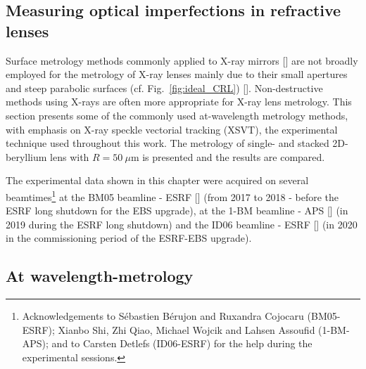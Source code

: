 \begin{refsection}
\chapter{Measuring optical imperfections in refractive lenses}\label{sec:measuring}

Surface metrology methods commonly applied to X-ray mirrors [\cite{Alcock2016, Vivo2019}] are not broadly employed for the metrology of X-ray lenses mainly due to their small apertures and steep parabolic surfaces (cf. Fig.~\ref{fig:ideal_CRL}) [\cite{Lyatun2015}]. Non-destructive methods using X-rays are often more appropriate for X-ray lens metrology. This section presents some of the commonly used at-wavelength metrology methods, with emphasis on X-ray speckle vectorial tracking (XSVT), the experimental technique used throughout this work. The metrology of single- and stacked 2D-beryllium lens with $R=50~\mu$m is presented and the results are compared. 

The experimental data shown in this chapter were acquired on several beamtimes\footnote{Acknowledgements to Sébastien Bérujon and Ruxandra Cojocaru (BM05-ESRF); Xianbo Shi, Zhi Qiao, Michael Wojcik and Lahsen Assoufid (1-BM-APS); and to Carsten Detlefs (ID06-ESRF) for the help during the experimental sessions.} at the BM05 beamline - ESRF [\cite{Ziegler2004}] (from 2017 to 2018 - before the ESRF long shutdown for the EBS upgrade), at the 1-BM beamline - APS [\cite{Macrander2016}] (in 2019 during the ESRF long shutdown) and the ID06 beamline - ESRF [\cite{Kutsal_2019}] (in 2020 in the commissioning period of the ESRF-EBS upgrade).


\section{At wavelength-metrology}\label{sec:at_wavelength}


\end{refsection}

